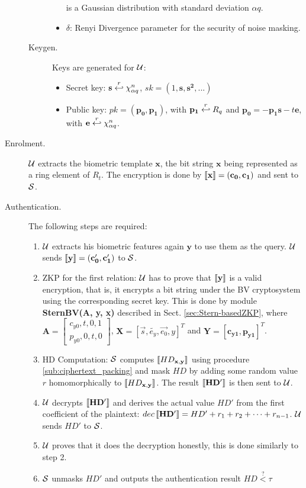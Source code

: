 \begin{description}
\begin{description}
\begin{itemize}
      is a Gaussian distribution with standard deviation $\alpha q$.
    \item \(\delta\): Renyi Divergence parameter for the security of noise masking.
    \end{itemize}
  \item[Keygen.] Keys are generated for $\mathcal{U}$:
    \begin{itemize}
    \item Secret key: $\mathbf{s} \stackrel{r}{\hookleftarrow} \chi_{\alpha q}^n$, \(sk = (1, \mathbf{s, s^{2}, ...})\)
    \item Public key: $pk = \mathbf{(p_0,p_1)}$, with $\mathbf{p_1} \stackrel{r}{\hookleftarrow} R_q$ and
      $\mathbf{p_0} = -\mathbf{p_1s} - t\mathbf{e}$, with $\mathbf{e} \stackrel{r}{\hookleftarrow} \chi_{\alpha q}^n$.
    \end{itemize}
  \end{description}
\item [Enrolment.] $\mathcal{U}$ extracts the biometric template $\mathbf{x}$, the bit string $\mathbf{x}$ being
  represented as a ring element of ${R}_t$.  The encryption is done by $\left\llbracket\mathbf{x}\right\rrbracket = (\mathbf{c_0},\mathbf{c_1})$
  and sent to $\mathcal{S}$.
\item [Authentication.] The following steps are required:
  \begin{enumerate}
  \item $\mathcal{U}$ extracts his biometric features again $\mathbf{y}$ to use them as the query. $\mathcal{U}$ sends
    $\left\llbracket\mathbf{y}\right\rrbracket = (\mathbf{c_0', c_1'})$ to $\mathcal{S}$.
  \item ZKP for the first relation: $\mathcal{U}$ has to prove that $\left\llbracket\mathbf{y}\right\rrbracket$ is a valid encryption, that is, it
    encrypts a bit string under the BV cryptosystem using the corresponding secret key. This is done by module
    \textbf{SternBV(A, y, x)} described in Sect. \ref{sec:Stern-basedZKP}, where
    $\mathbf{A} = \begin{bmatrix} c_{y0}, t, 0, 1\\p_{y0}, 0, t, 0
    \end{bmatrix}$, \(\mathbf{X} = [\vec{s},\tilde{e_{y}},\vec{e_{0}},y]^T\) and \(\mathbf{Y
    = [c_{y1},p_{y1}]}^{T}\).

\item HD Computation: $\mathcal{S}$ computes $\left\llbracket HD_{\mathbf{x,y}}\right\rrbracket$ using
  procedure \ref{sub:ciphertext_packing} and mask $HD$ by adding some random
  value $r$ homomorphically to $\left\llbracket HD_{\mathbf{x,y}}\right\rrbracket$. The result
  $\left\llbracket\mathbf{HD'}\right\rrbracket$ is then sent to $\mathcal{U}$.
\item \(\mathcal{U}\) decrypts $\left\llbracket\mathbf{HD'}\right\rrbracket$ and derives the actual value
  ${HD'}$ from the first coefficient of the plaintext:
  \( dec\left\llbracket\mathbf{HD'}\right\rrbracket = HD' + r_1 + r_2 + \dots + r_{n-1} \). \(\mathcal{U}\)
  sends \(HD'\) to \(\mathcal{S}\).
\item \(\mathcal{U}\) proves that it does the decryption honestly, this is done
  similarly to step 2.
\item \(\mathcal{S}\) unmasks \(HD'\) and outputs the authentication result
  \(HD \stackrel{?}{<} \tau\)
  \end{enumerate}

\end{description}

